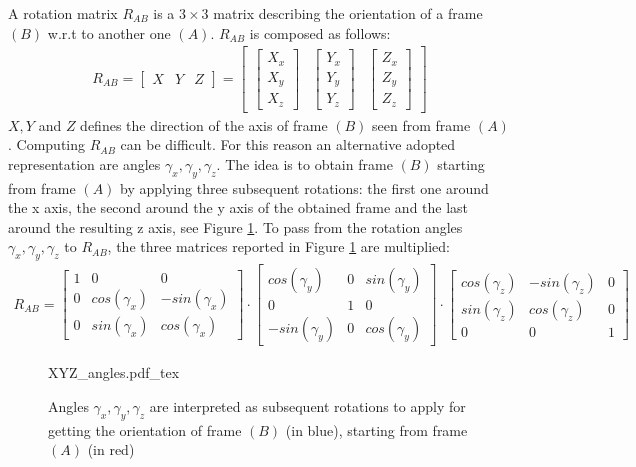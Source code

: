 \documentclass{article}
\begin{document}
\begin{appendices}
A rotation matrix $R_{AB}$ is a $3 \times 3$ matrix describing the orientation of a frame $(B)$ w.r.t to another one $(A)$. $R_{AB}$ is composed as follows:
\begin{eqnarray}
R_{AB} = \begin{bmatrix}
X & Y & Z
\end{bmatrix} = 
 \begin{bmatrix}
\begin{bmatrix} X_x\\ X_y \\ X_z \end{bmatrix} 
&  
\begin{bmatrix} Y_x\\ Y_y \\ Y_z \end{bmatrix} 
& 
\begin{bmatrix} Z_x\\ Z_y \\ Z_z \end{bmatrix} 
\end{bmatrix}
\end{eqnarray}
$X,Y$ and $Z$ defines the direction of the axis of frame $(B)$ seen from frame $(A)$.
Computing $R_{AB}$ can be difficult. For this reason an alternative adopted representation are angles $\gamma_x, \gamma_y, \gamma_z$. The idea is to obtain frame $(B)$ starting from frame $(A)$ by applying three subsequent rotations: the first one around the x axis, the second around the y axis of the obtained frame and the last around the resulting z axis, see Figure \ref{fig:XYZ_angles}.
To pass from the rotation angles $\gamma_x, \gamma_y, \gamma_z$ to $R_{AB}$, the three matrices reported in Figure \ref{fig:XYZ_angles} are multiplied:
\begin{eqnarray}
R_{AB} = 
\begin{bmatrix} 1 & 0 & 0\\ 0  & cos(\gamma_x) & -sin(\gamma_x) \\ 0 & sin(\gamma_x) & cos(\gamma_x) \end{bmatrix}
\cdot  
\begin{bmatrix} cos(\gamma_y) & 0 & sin(\gamma_y) \\  0 & 1 & 0\\  -sin(\gamma_y) & 0 & cos(\gamma_y) \end{bmatrix}
\cdot 
\begin{bmatrix} cos(\gamma_z) & -sin(\gamma_z) & 0\\  sin(\gamma_z) & cos(\gamma_z) & 0\\  0 & 0 & 1 \end{bmatrix}
\end{eqnarray}

\begin{figure}
	\centering
\def\svgwidth{0.7 \columnwidth}
{XYZ_angles.pdf_tex} 
	\caption{Angles $\gamma_x, \gamma_y, \gamma_z$ are interpreted as subsequent rotations to apply for getting the orientation of frame $(B)$ (in blue), starting from frame $(A)$ (in red) }
	\label{fig:XYZ_angles}
\end{figure}

\end{appendices}
 
\end{document}
